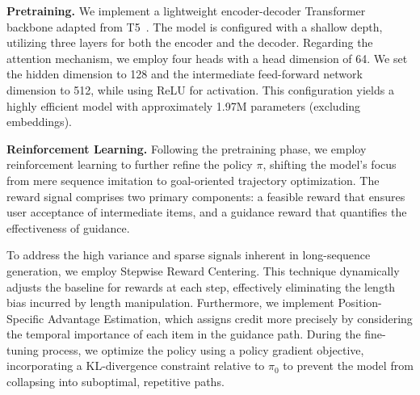 \documentclass{llmxive}
\begin{document}
\begin{table}[t!]
  \centering
\caption{Experimental Results on Different Datasets}
\label{tab:ablation_dataprocess}
\end{table}

\textbf{Pretraining.} We implement a lightweight encoder-decoder Transformer backbone adapted from T5~\cite{raffel2020exploring}. The model is configured with a shallow depth, utilizing three layers for both the encoder and the decoder. Regarding the attention mechanism, we employ four heads with a head dimension of 64. We set the hidden dimension to 128 and the intermediate feed-forward network dimension to 512, while using ReLU for activation. This configuration yields a highly efficient model with approximately 1.97M parameters (excluding embeddings).

\textbf{Reinforcement Learning.} Following the pretraining phase, we employ reinforcement learning to further refine the policy $\pi$, shifting the model's focus from mere sequence imitation to goal-oriented trajectory optimization. The reward signal comprises two primary components: a feasible reward that ensures user acceptance of intermediate items, and a guidance reward that quantifies the effectiveness of guidance.

To address the high variance and sparse signals inherent in long-sequence generation, we employ Stepwise Reward Centering. This technique dynamically adjusts the baseline for rewards at each step, effectively eliminating the length bias incurred by length manipulation. Furthermore, we implement Position-Specific Advantage Estimation, which assigns credit more precisely by considering the temporal importance of each item in the guidance path. During the fine-tuning process, we optimize the policy using a policy gradient objective, incorporating a KL-divergence constraint relative to $\pi_0$ to prevent the model from collapsing into suboptimal, repetitive paths.
\end{document}
